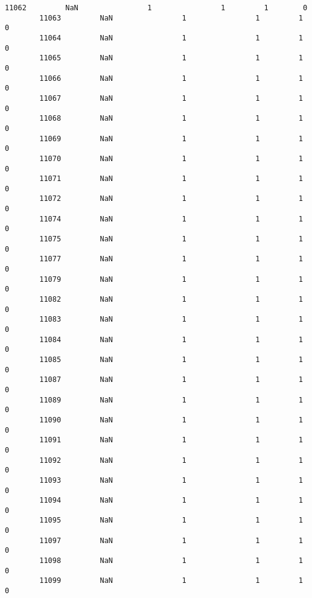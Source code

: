 \documentclass[11pt]{article}
\begin{document}
\begin{Verbatim}[commandchars=\\\{\}]
        11062         NaN                1                1         1        0   
        11063         NaN                1                1         1        0   
        11064         NaN                1                1         1        0   
        11065         NaN                1                1         1        0   
        11066         NaN                1                1         1        0   
        11067         NaN                1                1         1        0   
        11068         NaN                1                1         1        0   
        11069         NaN                1                1         1        0   
        11070         NaN                1                1         1        0   
        11071         NaN                1                1         1        0   
        11072         NaN                1                1         1        0   
        11074         NaN                1                1         1        0   
        11075         NaN                1                1         1        0   
        11077         NaN                1                1         1        0   
        11079         NaN                1                1         1        0   
        11082         NaN                1                1         1        0   
        11083         NaN                1                1         1        0   
        11084         NaN                1                1         1        0   
        11085         NaN                1                1         1        0   
        11087         NaN                1                1         1        0   
        11089         NaN                1                1         1        0   
        11090         NaN                1                1         1        0   
        11091         NaN                1                1         1        0   
        11092         NaN                1                1         1        0   
        11093         NaN                1                1         1        0   
        11094         NaN                1                1         1        0   
        11095         NaN                1                1         1        0   
        11097         NaN                1                1         1        0   
        11098         NaN                1                1         1        0   
        11099         NaN                1                1         1        0   
        

\end{Verbatim}
\end{document}
